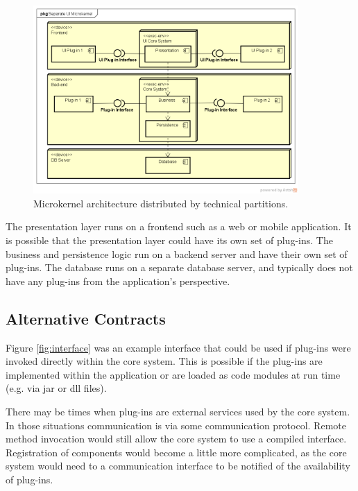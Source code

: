 \begin{figure}[h!]
    \centering
    \includegraphics[trim=40 41 18 43,clip,width=0.9\textwidth]{diagrams/separate-ui-microkernel.png}
    \caption{Microkernel architecture distributed by technical partitions.}
    \label{fig:3-tier-microkernel}
\end{figure}

The presentation layer runs on a frontend such as a web or mobile application.
It is possible that the presentation layer could have its own set of plug-ins.
The business and persistence logic run on a backend server and have their own set of plug-ins.
The database runs on a separate database server, and typically does not have any plug-ins from the application's perspective.

\subsection{Alternative Contracts}

Figure \ref{fig:interface} was an example interface that could be used if plug-ins were invoked directly within the core system.
This is possible if the plug-ins are implemented within the application or are loaded as code modules at run time (e.g. via jar or dll files).

There may be times when plug-ins are external services used by the core system.
In those situations communication is via some communication protocol.
Remote method invocation would still allow the core system to use a compiled interface.
Registration of components would become a little more complicated,
as the core system would need to a communication interface to be notified of the availability of plug-ins.


